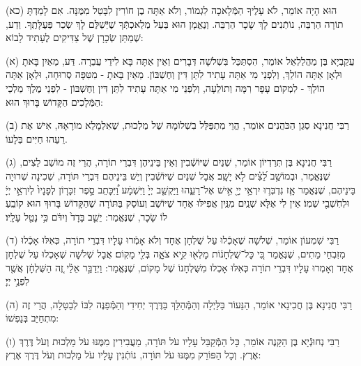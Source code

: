 \documentclass[twoside, openany, parskip=half, 11pt]{book}
\begin{document}
(כא) הוּא הָיָה אוֹמֵר, לֹא עָלֶיךָ הַמְּֿלָאכָה לִגְמוֹר, וְלֹא אַתָּה בֶן חוֹרִין לִבָּטֵל מִמֶּנָּה. אִם לָמַדְתָּ תוֹרָה הַרְבֵּה, נוֹתְֿנִים לָךְ שָׂכָר הַרְבֵּה. וְנֶאֱמָן הוּא בַּעַל מְלַאכְתְּֿךָ שֶׁיְּֿשַׁלֶּם לָךְ שְׂכַר פְּעֻלָּתֶֽךָ. וְדַע, שֶׁמַתַּן שְׂכָרָן שֶׁל צַדִּיקִים לֶעָתִיד לָבוֹא:


\kolyisroel

(א)
עֲקַבְיָא בֶּן מַהֲלַלְאֵל אוֹמֵר, הִסְתַּכֵּל בִּשְׁלֹשָׁה דְּבָרִים וְאֵין אַתָּה בָּא לִידֵי עֲבֵרָה. דַּע, מֵאַיִן בָּאתָ וּלְאָן אַתָּה הוֹלֵךְ, וְלִפְנֵי מִי אַתָּה עָתִיד לִתֵּן דִּין וְחֶשְׁבּוֹן.
מֵאַיִן בָּאתָ - מִטִּפָּה סְרוּחָה,
וּלְאָן אַתָּה הוֹלֵךְ - לִמְקוֹם עָפָר רִמָּה וְתוֹלֵעָה,
וְלִפְנֵי מִי אַתָּה עָתִיד לִתֵּן דִּין וְחֶשְׁבּוֹן - לִפְנֵי מֶלֶךְ מַלְכֵי הַמְּֿלָכִים הַקָּדוֹשׁ בָּרוּךְ הוּא:

(ב)
רַבִּי חֲנִינָא סְגַן הַכֹּהֲנִים אוֹמֵר, הֱוֵי מִתְפַּלֵּל בִשְׁלוֹמָהּ שֶׁל מַלְכוּת, שֶׁאִלְמָלֵא מוֹרָאָהּ, אִישׁ אֶת רֵעֵהוּ חַיִּים בְּלָעוֹ.

(ג)
רַבִּי חֲנִינָא בֶּן תְּרַדְיוֹן אוֹמֵר, שְׁנַיִם שֶׁיּוֹשְֿׁבִין וְאֵין בֵּינֵיהֶן דִּבְרֵי תוֹרָה, הֲרֵי זֶה מוֹשַׁב לֵצִים, שֶׁנֶּאֱמַר,  וּבְמוֹשַׁ֥ב לֵ֝צִ֗ים לֹ֣א יָשָֽׁב׃
אֲבָל שְׁנַיִם שֶׁיּוֹשְֿׁבִין וְיֵשׁ בֵּינֵיהֶם דִּבְרֵי תּוֹרָה, שְׁכִינָה שְׁרוּיָה בֵּינֵיהֶם, שֶׁנֶּאֱמַר אָ֧ז נִדְבְּר֛וּ יִרְאֵ֥י יְיָ֖ אִ֣ישׁ אֶל־רֵעֵ֑הוּ וַיַּקְשֵׁ֤ב יְיָ֙ וַיִּשְׁמָ֔ע וַ֠יִּכָּתֵב סֵ֣פֶר זִכָּר֤וֹן לְפָנָיו֙ לְיִרְאֵ֣י יְיָ֔ וּלְחֹֽשְׁבֵ֖י שְׁמֽוֹ׃ אֵין לִי אֶלָּא שְׁנַֽיִם מִנַּֽיִן אֲפִילּוּ אֶחָד שֶׁיּוֹשֵׁב וְעוֹסֵק בַּתּוֹרָה שֶׁהַקָּדוֹשׁ בָּרוּךְ הוּא קוֹבֵֽעַ לוֹ שָׂכָר, שֶׁנֶּאֱמַר: יֵשֵׁ֤ב בָּדָד֙ וְיִדֹּ֔ם כִּ֥י נָטַ֖ל עָלָֽיו׃

(ד)
רַבִּי שִׁמְעוֹן אוֹמֵר, שְׁלֹשָׁה שֶׁאָכְֿלוּ עַל שֻׁלְחָן אֶחָד וְלֹא אָמְֿרוּ עָלָיו דִּבְרֵי תוֹרָה, כְּאִלּוּ אָכְֿלוּ מִזִּבְחֵי מֵתִים, שֶׁנֶּאֱמַר כִּ֚י כָּל־שֻׁלְחָנ֔וֹת מָלְא֖וּ קִ֣יא צֹאָ֑ה בְּלִ֖י מָקֽוֹם׃ אֲבָל שְׁלשָׁה שֶׁאָכְלוּ עַל שֻׁלְחָן אֶחָד וְאָמְרוּ עָלָיו דִּבְרֵי תוֹרָה כְּאִלּוּ אָכְלוּ מִשֻּׁלְחָנוֹ שֶׁל מָקוֹם, שֶׁנֶּאֱמַר: וַיְדַבֵּ֣ר אֵלַ֔י זֶ֚ה הַשֻּׁלְחָ֔ן אֲשֶׁ֖ר לִפְנֵ֥י יְיָ׃



(ה)
רַבִּי חֲנִינָא בֶּן חֲכִינַאי אוֹמֵר, הַנֵּעוֹר בַּלַּיְלָה וְהַמְּֿהַלֵּךְ בַּדֶּרֶךְ יְחִידִי וְהַמְּֿפַנֶּה לִבּוֹ לְבַטָּלָה,
הֲרֵי זֶה מִתְחַיֵּב בְּנַפְשׁוֹ:

(ו)
רַבִּי נְחוּנְֿיָא בֶּן הַקָּנֶה אוֹמֵר, כָּל הַמְּֿקַבֵּל עָלָיו עֹל תּוֹרָה, מַעֲבִירִין מִמֶּנּוּ עֹל מַלְכוּת וְעֹל דֶּרֶךְ אֶרֶץ.
וְכָל הַפּוֹרֵק מִמֶּנּוּ עֹל תּוֹרָה, נוֹתְֿנִין עָלָיו עֹל מַלְכוּת וְעֹל דֶּרֶךְ אֶרֶץ:
\end{document}
